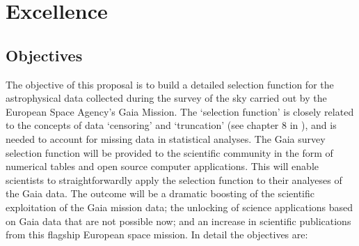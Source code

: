 \renewcommand{\thetable}{\thesection\alph{table}}

\chapter[Excellence]{Excellence}
\label{cha:excellence}

\section{Objectives}
\label{sec:objectives}

The objective of this proposal is to build a detailed selection function for the astrophysical data collected during the survey of the sky carried out by the European Space Agency's Gaia Mission. The `selection function' is closely related to the concepts of data `censoring' and `truncation' (see chapter 8 in \cite{Gelman}), and is needed to account for missing data in statistical analyses. The Gaia survey selection function will be provided to the scientific community in the form of numerical tables and open source computer applications. This will enable scientists to straightforwardly apply the selection function to their analyeses of the Gaia data. The outcome will be a dramatic boosting of the scientific exploitation of the Gaia mission data; the unlocking of science applications based on Gaia data that are not possible now; and an increase in scientific publications from this flagship European space mission. In detail the objectives are:

